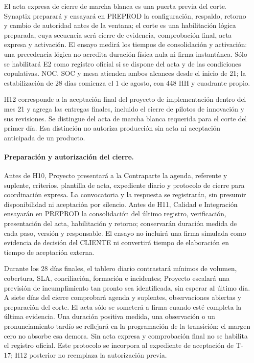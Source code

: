 El acta expresa de cierre de marcha blanca es una puerta previa del corte. Synaptix preparará y ensayará en PREPROD la configuración, respaldo, retorno y cambio de autoridad antes de la ventana; el corte es una habilitación lógica preparada, cuya secuencia será cierre de evidencia, comprobación final, acta expresa y activación. El ensayo medirá los tiempos de consolidación y activación: una precedencia lógica no acredita duración física nula ni firma instantánea. Sólo se habilitará E2 como registro oficial si se dispone del acta y de las condiciones copulativas. NOC, SOC y mesa atienden ambos alcances desde el inicio de 21; la estabilización de 28 días comienza el 1 de agosto, con 448 HH y cuadrante propio.

H12 corresponde a la aceptación final del proyecto de implementación dentro del mes 21 y agrega las entregas finales, incluido el cierre de pilotos de innovación y sus revisiones. Se distingue del acta de marcha blanca requerida para el corte del primer día. Esa distinción no autoriza producción sin acta ni aceptación anticipada de un producto.

\paragraph{Preparación y autorización del cierre.} Antes de H10, Proyecto presentará a la Contraparte la agenda, referente y suplente, criterios, plantilla de acta, expediente diario y protocolo de cierre para coordinación expresa. La convocatoria y la respuesta se registrarán, sin presumir disponibilidad ni aceptación por silencio. Antes de H11, Calidad e Integración ensayarán en PREPROD la consolidación del último registro, verificación, presentación del acta, habilitación y retorno; conservarán duración medida de cada paso, versión y responsable. El ensayo no incluirá una firma simulada como evidencia de decisión del CLIENTE ni convertirá tiempo de elaboración en tiempo de aceptación externa.

Durante los 28 días finales, el tablero diario contrastará mínimos de volumen, cobertura, SLA, conciliación, formación e incidentes; Proyecto escalará una previsión de incumplimiento tan pronto sea identificada, sin esperar al último día. A siete días del cierre comprobará agenda y suplentes, observaciones abiertas y preparación del corte. El acta sólo se someterá a firma cuando esté completa la última evidencia. Una duración positiva medida, una observación o un pronunciamiento tardío se reflejará en la programación de la transición: el margen cero no absorbe esa demora. Sin acta expresa y comprobación final no se habilita el registro oficial. Este protocolo se incorpora al expediente de aceptación de T-17; H12 posterior no reemplaza la autorización previa.\parencite[arts.~17--18, pp.~12--13]{bases-admin}

